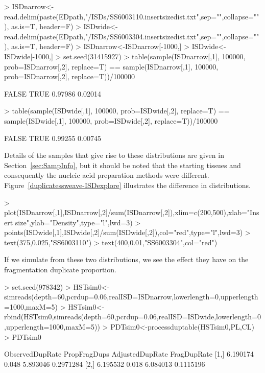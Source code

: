 \documentclass{article}
\begin{document}
\begin{Schunk}
\begin{Sinput}
> ISDnarrow<-read.delim(paste(EDpath,"/ISDs/SS6003110.insertsizedist.txt",sep="",collapse=""), as.is=T, header=F)
> ISDwide<-read.delim(paste(EDpath,"/ISDs/SS6003304.insertsizedist.txt",sep="",collapse=""), as.is=T, header=F)
> ISDnarrow<-ISDnarrow[-1000,]
> ISDwide<-ISDwide[-1000,]
> set.seed(31415927)
> table(sample(ISDnarrow[,1], 100000, prob=ISDnarrow[,2], replace=T) == sample(ISDnarrow[,1], 100000, prob=ISDnarrow[,2], replace=T))/100000
\end{Sinput}
\begin{Soutput}
  FALSE    TRUE 
0.97986 0.02014 
\end{Soutput}
\begin{Sinput}
> table(sample(ISDwide[,1], 100000, prob=ISDwide[,2], replace=T) == sample(ISDwide[,1], 100000, prob=ISDwide[,2], replace=T))/100000
\end{Sinput}
\begin{Soutput}
  FALSE    TRUE 
0.99255 0.00745 
\end{Soutput}
\end{Schunk}

Details of the samples that give rise to these distributions are given in Section~\ref{sec:SampInfo}, but it should be noted that the starting tissues and consequently the nucleic acid preparation methods were different. Figure~\ref{duplicatessweave-ISDexplore} illustrates the difference in distributions.

\begin{Schunk}
\begin{Sinput}
> plot(ISDnarrow[,1],ISDnarrow[,2]/sum(ISDnarrow[,2]),xlim=c(200,500),xlab="Insert size",ylab="Density",type="l",lwd=3)
> points(ISDwide[,1],ISDwide[,2]/sum(ISDwide[,2]),col="red",type="l",lwd=3)
> text(375,0.025,"SS6003110")
> text(400,0.01,"SS6003304",col="red")
\end{Sinput}
\end{Schunk}


If we simulate from these two distributions, we see the effect they have on the fragmentation duplicate proportion.

\begin{Schunk}
\begin{Sinput}
> set.seed(978342)
> HSTsim0<-simreads(depth=60,pcrdup=0.06,realISD=ISDnarrow,lowerlength=0,upperlength=1000,maxM=5)
> HSTsim0<-rbind(HSTsim0,simreads(depth=60,pcrdup=0.06,realISD=ISDwide,lowerlength=0,upperlength=1000,maxM=5))
> PDTsim0<-processduptable(HSTsim0,PL,CL)
> PDTsim0
\end{Sinput}
\begin{Soutput}
     ObservedDupRate PropFragDups AdjustedDupRate FragDupRate
[1,]        6.190174        0.048        5.893046   0.2971284
[2,]        6.195532        0.018        6.084013   0.1115196
\end{Soutput}
\end{Schunk}
\end{document}
